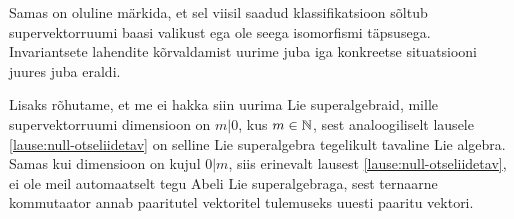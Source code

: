 Samas on oluline märkida, et sel viisil
saadud klassifikatsioon sõltub supervektorruumi baasi valikust ega ole seega
isomorfismi täpsusega. Invariantsete lahendite kõrvaldamist uurime juba iga
konkreetse situatsiooni juures juba eraldi.

Lisaks rõhutame, et me ei hakka siin uurima Lie superalgebraid,
mille supervektorruumi dimensioon on $m|0$, kus $m \in \mathbb{N}$, sest
analoogiliselt lausele \ref{lause:null-otseliidetav} on selline Lie
superalgebra tegelikult tavaline Lie algebra. Samas kui dimensioon on
kujul $0|m$, siis erinevalt lausest \ref{lause:null-otseliidetav}, ei ole
meil automaatselt tegu Abeli Lie superalgebraga, sest ternaarne kommutaator
annab paaritutel vektoritel tulemuseks uuesti paaritu vektori.
